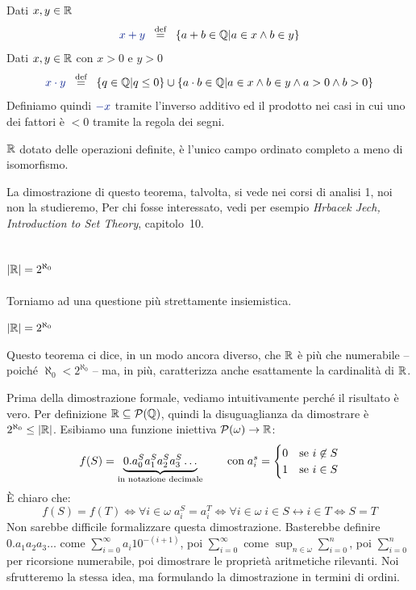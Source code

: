 \begin{definition}
	Dati $x,y \in \mathbb R$
	\[ {\drkblu x + y} \;\;\Mydef\;\; \{a + b \in \QQ | a \in x \land b \in y\}
		\]
	Dati $x,y \in \mathbb R$ con $x > 0$ e $y > 0$
	\[ {\drkblu x \cdot y} \;\;\Mydef\;\; \{q \in \QQ | q \leq 0\} \cup \{a\cdot b \in \QQ| a \in x  \land b \in y \land a > 0 \land b > 0\}
		\]
Definiamo quindi $\drkblu -x$ tramite l'inverso additivo ed il prodotto
nei casi in cui uno dei fattori \`e $<0$ tramite la regola dei segni.
\end{definition}


\begin{theorem}
	$\mathbb R$ dotato delle operazioni definite, \`e l'unico campo ordinato completo a meno di isomorfismo.
\end{theorem}

La dimostrazione di questo teorema, talvolta, si vede nei corsi di analisi
1, noi non la studieremo, Per chi fosse interessato, vedi per esempio
\textit{Hrbacek Jech, Introduction to Set Theory}, capitolo~10.

\subsection{$|\mathbb R| = 2^{\aleph_0}$}
Torniamo ad una questione pi\`u strettamente insiemistica.

\begin{theorem}\label{crdr}
	$|\mathbb R| = 2^{\aleph_0}$
\end{theorem}

Questo teorema ci dice, in un modo ancora diverso, che $\mathbb R$ \`e pi\`u che
numerabile -- poich\'e $\aleph_0 < 2^{\aleph_0}$ -- ma, in pi\`u, caratterizza
anche esattamente la cardinalit\`a di $\mathbb R$.

{\drkgrn Prima della dimostrazione formale, vediamo intuitivamente perch\'e il risultato \`e vero. Per definizione $\mathbb R \subseteq \mathcal{P}(\mathbb Q)$, quindi la disuguaglianza da dimostrare \`e $2^{\aleph_0} \leq |\mathbb R|$.
Esibiamo una funzione iniettiva $\mathcal{P}(\omega) \to \mathbb R$:
\[ f(S) = \underbrace{0.a_0^Sa_1^Sa_2^Sa_3^S\ldots}_{\text{in notazione
decimale}} \qquad \text{con} \; a_i^s = \begin{cases}
	0 &\text{\text{se $i \not\in S$}} \\
	1 &\text{\text{se $i \in S$}}
\end{cases}
	\]
\`E chiaro che:
\[ f(S) = f(T) \iff \forall {i \in \omega} \; a_i^S = a_i^T \iff \forall
{i \in \omega} \; i \in S \leftrightarrow i \in T \iff S = T
	\]
Non sarebbe difficile formalizzare questa dimostrazione.
Basterebbe definire $0.a_1a_2a_3\ldots$ come $\sum_{i = 0}^\infty a_i 10^{-(i + 1)}$, poi $\sum_{i = 0}^\infty$
come $\sup_{n \in \omega}\sum_{i = 0}^n$, poi $\sum_{i = 0}^n$ per ricorsione numerabile, poi dimostrare le propriet\`a aritmetiche rilevanti. Noi sfrutteremo la stessa idea, 
ma formulando la dimostrazione in termini di ordini.}

